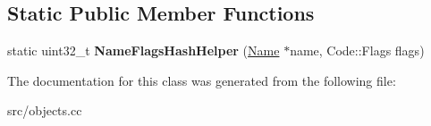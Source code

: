 \subsection*{Static Public Member Functions}
\begin{DoxyCompactItemize}
\item 
\hypertarget{classv8_1_1internal_1_1_code_cache_hash_table_key_a02223a374cae60f793d50dfaa6f99a9c}{}static uint32\+\_\+t {\bfseries Name\+Flags\+Hash\+Helper} (\hyperlink{classv8_1_1internal_1_1_name}{Name} $\ast$name, Code\+::\+Flags flags)\label{classv8_1_1internal_1_1_code_cache_hash_table_key_a02223a374cae60f793d50dfaa6f99a9c}

\end{DoxyCompactItemize}


The documentation for this class was generated from the following file\+:\begin{DoxyCompactItemize}
\item 
src/objects.\+cc\end{DoxyCompactItemize}
